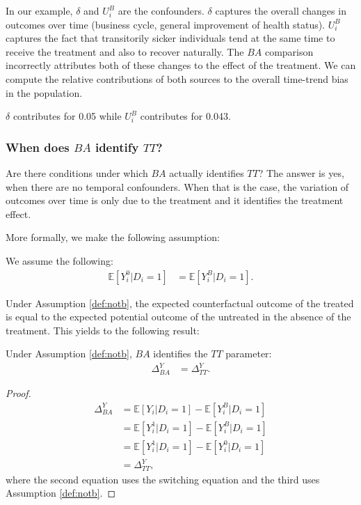 \documentclass[]{book}
\newcommand{\esp}[1]{\mathbb{E}[ #1 ]}
\theoremstyle{definition}
\theoremstyle{definition}
\theoremstyle{definition}
\theoremstyle{remark}
\let\BeginKnitrBlock\begin \let\EndKnitrBlock\end
\begin{document}
\BeginKnitrBlock{example}
\protect\hypertarget{exm:unnamed-chunk-29}{}{\label{exm:unnamed-chunk-29} }In our example, \(\delta\) and \(U_i^B\) are the confounders.
\(\delta\) captures the overall changes in outcomes over time (business cycle, general improvement of health status).
\(U^B_i\) captures the fact that transitorily sicker individuals tend at the same time to receive the treatment and also to recover naturally.
The \(BA\) comparison incorrectly attributes both of these changes to the effect of the treatment.
We can compute the relative contributions of both sources to the overall time-trend bias in the population.
\EndKnitrBlock{example}

\(\delta\) contributes for 0.05 while \(U^B_i\) contributes for 0.043.

\hypertarget{when-does-ba-identify-tt}{%
\subsubsection{\texorpdfstring{When does \(BA\) identify \(TT\)?}{When does BA identify TT?}}\label{when-does-ba-identify-tt}}

Are there conditions under which \(BA\) actually identifies \(TT\)?
The answer is yes, when there are no temporal confounders.
When that is the case, the variation of outcomes over time is only due to the treatment and it identifies the treatment effect.

More formally, we make the following assumption:

\BeginKnitrBlock{definition}[No time trend bias]
\protect\hypertarget{def:notb}{}{\label{def:notb} \iffalse (No time trend bias) \fi{} }We assume the following:
\begin{align*}
\esp{Y_i^0|D_i=1} & = \esp{Y_i^B|D_i=1}.
\end{align*}
\EndKnitrBlock{definition}

Under Assumption \ref{def:notb}, the expected counterfactual outcome of the treated is equal to the expected potential outcome of the untreated in the absence of the treatment.
This yields to the following result:

\BeginKnitrBlock{theorem}
\protect\hypertarget{thm:batt}{}{\label{thm:batt} }Under Assumption \ref{def:notb}, \(BA\) identifies the \(TT\) parameter:
\begin{align*}
\Delta^Y_{BA} & = \Delta^Y_{TT}.
\end{align*}
\EndKnitrBlock{theorem}

\BeginKnitrBlock{proof}
\iffalse{} {Proof. } \fi{}\begin{align*}
\Delta^Y_{BA} & = \esp{Y_i|D_i=1}-\esp{Y_i^B|D_i=1}\\
              & = \esp{Y_i^1|D_i=1}-\esp{Y_i^B|D_i=1}\\
              & = \esp{Y_i^1|D_i=1}-\esp{Y_i^0|D_i=1} \\
              & = \Delta^Y_{TT},
\end{align*}
where the second equation uses the switching equation and the third uses Assumption \ref{def:notb}.
\EndKnitrBlock{proof}
\end{document}
